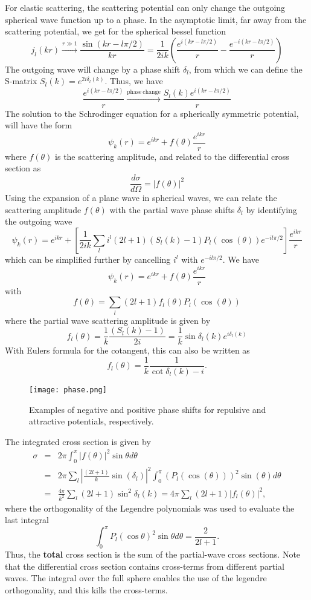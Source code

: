 \documentclass[graybox,sectrefs,envcountresetchap,open=right]{svmonodo}
\begin{document}
For elastic scattering, the scattering potential can only change the outgoing spherical wave function up to a phase. In the asymptotic limit, far away from the scattering potential, we get for the spherical bessel function
\[
j_l(kr) \xrightarrow[]{ r \gg 1} \frac{\sin(kr -l\pi/2)}{kr} =  \frac{1}{2ik}\left( \frac{e^{i(kr-l\pi/2)}}{r} - \frac{e^{-i(kr-l\pi/2)}}{r}\right)
\]
The outgoing wave will change by a phase shift $\delta_l$, from which we can define the S-matrix $S_l(k) = e^{2i\delta_l(k)}$. Thus, we have
\[
 \frac{e^{i(kr-l\pi/2)}}{r} \xrightarrow[]{\mathrm{phase~change}}  \frac{S_l(k)e^{i(kr-l\pi/2)}}{r}
\]
The solution to the Schrodinger equation for a spherically symmetric potential, will have the form
\[
\psi_k(r) = e^{ikr} + f(\theta)\frac{e^{ikr}}{r}
\]
where $f(\theta)$ is the scattering amplitude, and related to the differential cross section as
\[
\frac{d\sigma}{d\Omega} = |f(\theta)|^2
\]
Using the expansion of a plane wave in spherical waves, we can relate the scattering amplitude $f(\theta)$ with the partial wave phase shifts $\delta_l$ by identifying the outgoing wave 
\[
\psi_k(r) = e^{ikr} + \left[\frac{1}{2ik}\sum_l i^l (2l+1) (S_l(k)-1)P_l(\cos(\theta))e^{-il\pi/2}\right] \frac{e^{ikr}}{r}
\]
which can be simplified further by cancelling $i^l$ with $e^{-il\pi/2}$. We have
\[
\psi_k(r) = e^{ikr} + f(\theta) \frac{e^{ikr}}{r}
\]
with 
\[
f(\theta) = \sum_l (2l+1)f_l(\theta) P_l(\cos(\theta))
\]
where the partial wave scattering amplitude is given by
\[
f_l(\theta) = \frac{1}{k}\frac{(S_l(k)-1)}{2i} = \frac{1}{k}\sin\delta_l(k) e^{i\delta_l(k)}
\]
With Eulers formula for the cotangent, this can also be written as
\[
f_l(\theta) = \frac{1}{k}\frac{1}{\cot \delta_l(k) - i}.
\]


\begin{figure}[t]
  \centerline{\texttt{[image: phase.png]}}
  
  \vspace{.5cm}
  \caption{
  Examples of negative and positive phase shifts for repulsive and attractive potentials, respectively.
  }
\end{figure}


\noindent
The integrated cross section is given by
\begin{eqnarray*}
\sigma & = & 2\pi \int_0^{\pi} |f(\theta)|^2 \sin \theta d\theta \\ & = & 
2\pi \sum_l |\frac{(2l+1)}{k} \sin(\delta_l)|^2 \int_0^{\pi} (P_l(\cos(\theta)))^2 \sin(\theta) d\theta \\
& = & \frac{4\pi}{k^2} \sum_l (2l+1) \sin^2\delta_l(k) = 4\pi \sum_l (2l+1)|f_l(\theta)|^2, 
\end{eqnarray*}
where the orthogonality of the Legendre polynomials was used to evaluate the last integral
\[
\int_0^{\pi} P_l(\cos \theta)^2 \sin \theta d\theta = \frac{2}{2l+1}.
\]
Thus, the \textbf{total} cross section is the sum of the partial-wave cross sections. Note that the differential cross section contains cross-terms from different partial waves. The integral over the full sphere enables the use of the legendre orthogonality, and this kills the cross-terms.
\end{document}
